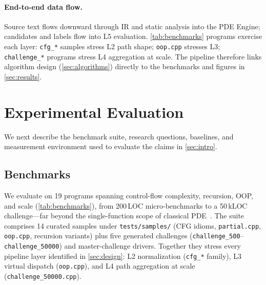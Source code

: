 \documentclass[acmsmall,screen,review,anonymous]{acmart}
\begin{document}
\paragraph{End-to-end data flow.}
Source text flows downward through IR and static analysis into the PDE Engine; candidates and labels flow into L5 evaluation. \autoref{tab:benchmarks} programs exercise each layer: \texttt{cfg\_*} samples stress L2 path shape; \texttt{oop.cpp} stresses L3; \texttt{challenge\_*} programs stress L4 aggregation at scale. The pipeline therefore links algorithm design (\autoref{sec:algorithms}) directly to the benchmarks and figures in \autoref{sec:results}.

\FloatBarrier
\section{Experimental Evaluation}
\label{sec:eval}
We next describe the benchmark suite, research questions, baselines, and measurement environment used to evaluate the claims in \autoref{sec:intro}.

\subsection{Benchmarks}
We evaluate on 19 programs spanning control-flow complexity, recursion, OOP, and scale (\autoref{tab:benchmarks}), from 200\,LOC micro-benchmarks to a 50\,kLOC challenge---far beyond the single-function scope of classical PDE~\cite{knoop1994partial,bodik1998efficient}. The suite comprises 14 curated samples under \texttt{tests/samples/} (CFG idioms, \texttt{partial.cpp}, \texttt{oop.cpp}, recursion variants) plus five generated challenges (\texttt{challenge\_500}--\texttt{challenge\_50000}) and master-challenge drivers. Together they stress every pipeline layer identified in \autoref{sec:design}: L2 normalization (\texttt{cfg\_*} family), L3 virtual dispatch (\texttt{oop.cpp}), and L4 path aggregation at scale (\texttt{challenge\_50000.cpp}).
\end{document}
